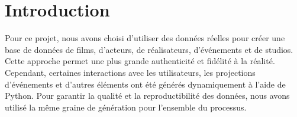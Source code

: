 \section{Introduction}

Pour ce projet, nous avons choisi d'utiliser des données réelles pour créer une base de données de films, d'acteurs, 
de réalisateurs, d'événements et de studios. 
Cette approche permet une plus grande authenticité et fidélité à la réalité. 
Cependant, certaines interactions avec les utilisateurs, les projections d'événements et d'autres éléments ont été 
générés dynamiquement à l'aide de Python. 
Pour garantir la qualité et la reproductibilité des données, nous avons utilisé la même graine de génération 
pour l'ensemble du processus.